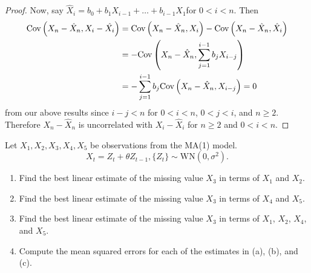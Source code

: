 \documentclass[12pt]{article}
\theoremstyle{definition}
\newenvironment{custompbm}[1]
  {\renewcommand\theproblem{#1}\problem}
  {\endproblem}
\newcommand{\Co}[2]{\text{Cov}\left({#1}, {#2}\right)}
\begin{document}
\begin{proof}
  Now, say $\hat{X}_i = b_0 + b_1 X_{i-1} + \dots + b_{i-1}X_{1}$for $0 < i < n$. Then
  \begin{align*}
    \Co{X_n - \hat{X}_n}{X_i - \hat{X_i}} &= \Co{X_n - \hat{X}_n}{X_i} - \Co{X_n - \hat{X}_n}{\hat{X}_i} \\
    &= -\Co{X_n - \hat{X}_n}{\sum_{j=1}^{i-1} b_j X_{i-j}} \notag\\
    &= -\sum_{j=1}^{i-1} b_j \Co{X_n - \hat{X}_n}{X_{i-j}} = 0 \notag \\
  \end{align*}
  from our above results since $i - j < n$ for $0 < i < n$, $0 < j < i$, and $n \geq 2$.
  Therefore $X_n - \hat{X}_n$ is uncorrelated with $X_i - \hat{X}_i$ for $n\geq 2$ and $0 < i < n$.


\end{proof}


\begin{custompbm}{2.21}
  Let $X_1, X_2, X_3, X_4, X_5$ be observations from the MA(1) model.
  \[
    X_t = Z_t + \theta Z_{t-1}, \{Z_t\} \sim \text{WN}(0, \sigma^2).
  \]
  \begin{enumerate}
    \item Find the best linear estimate of the missing value $X_3$ in terms of
      $X_1$ and $X_2$.
    \item Find the best linear estimate of the missing value $X_3$ in terms of
      $X_4$ and $X_5$.
    \item Find the best linear estimate of the missing value $X_3$ in terms of
      $X_1$, $X_2$, $X_4$, and $X_5$.
    \item Compute the mean squared errors for each of the estimates in (a),
      (b), and (c).
  \end{enumerate}
\end{custompbm}
\end{document}
